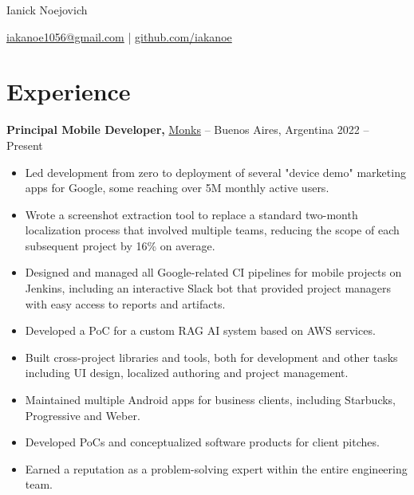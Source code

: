 \documentclass[11pt]{article}       %
\begin{document}
\centerline{\Huge Ianick Noejovich}

\vspace{6pt}

\centerline{\href{mailto:iakanoe1056@gmail.com}{iakanoe1056@gmail.com} | \href{https://github.com/iakanoe}{github.com/iakanoe}}

\vspace{-6pt}

\section*{Experience}

\textbf{Principal Mobile Developer,} \href{http://monks.com/}{Monks} -- Buenos Aires, Argentina \hfill 2022 -- Present \\
\vspace{-6pt}
\begin{itemize}
  \item Led development from zero to deployment of several "device demo" marketing apps for Google, some reaching over 5M monthly active users.
  \item Wrote a screenshot extraction tool to replace a standard two-month localization process that involved multiple teams, reducing the scope of each subsequent project by 16\% on average.
  \item Designed and managed all Google-related CI pipelines for mobile projects on Jenkins, including an interactive Slack bot that provided project managers with easy access to reports and artifacts.
  \item Developed a PoC for a custom RAG AI system based on AWS services.
  \item Built cross-project libraries and tools, both for development and other tasks including UI design, localized authoring and project management.
  \item Maintained multiple Android apps for business clients, including Starbucks, Progressive and Weber.
  \item Developed PoCs and conceptualized software products for client pitches.
  \item Earned a reputation as a problem-solving expert within the entire engineering team.
\end{itemize}

\vspace{3pt}
\end{document}
